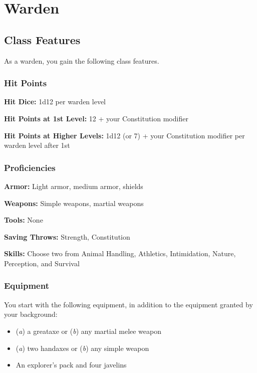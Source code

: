 \section{Warden}

\subsection{Class Features}

As a warden, you gain the following class features.

\subsubsection{Hit Points}

\textbf{Hit Dice:} 1d12 per warden level

\textbf{Hit Points at 1st Level:} 12 + your Constitution modifier

\textbf{Hit Points at Higher Levels:} 1d12 (or 7) + your Constitution modifier per warden level after 1st

\subsubsection{Proficiencies}

\textbf{Armor:} Light armor, medium armor, shields

\textbf{Weapons:} Simple weapons, martial weapons

\textbf{Tools:} None

\textbf{Saving Throws:} Strength, Constitution

\textbf{Skills:} Choose two from Animal Handling, Athletics, Intimidation, Nature, Perception, and Survival

\subsubsection{Equipment}

You start with the following equipment, in addition to the equipment granted by your background:

\begin{itemize}
\item  (\textit{a}) a greataxe or (\textit{b}) any martial melee weapon
\item  (\textit{a}) two handaxes or (\textit{b}) any simple weapon
\item  An explorer’s pack and four javelins
\end{itemize}

